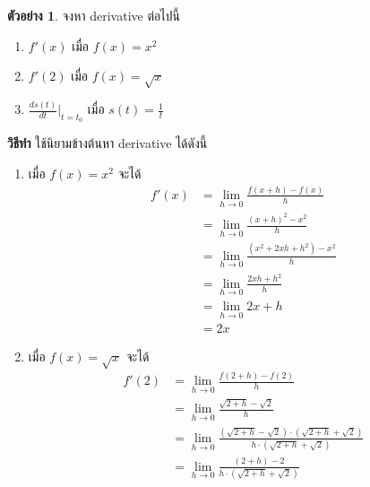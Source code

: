 \documentclass[
]{book}
\theoremstyle{definition}
\theoremstyle{definition}
\newtheorem{example}{ตัวอย่าง}[chapter]
\theoremstyle{definition}
\theoremstyle{definition}
\theoremstyle{remark}
\begin{document}
\begin{example}

จงหา derivative ต่อไปนี้

\begin{enumerate}
\def\labelenumi{(\arabic{enumi})}
\item
  \(f'(x)\) เมื่อ \(f(x) = x^2\)
\item
  \(f'(2)\) เมื่อ \(f(x) = \sqrt{x}\)
\item
  \(\frac{ds(t)}{dt}|_{t=t_0}\) เมื่อ \(s(t) = \frac{1}{t}\)
\end{enumerate}

\end{example}

\textbf{วิธีทำ} ใช้นิยามข้างต้นหา derivative ได้ดังนี้

\begin{enumerate}
\def\labelenumi{(\arabic{enumi})}
\item
  เมื่อ \(f(x) = x^2\) จะได้ \begin{equation}   \begin{aligned}
              f'(x) &= \underset{h \rightarrow 0}{\lim}\frac{f(x+h) - f(x)}{h} \\
                  &= \underset{h \rightarrow 0}{\lim}\frac{(x+h)^2-x^2}{h} \\
                  &= \underset{h \rightarrow 0}{\lim}\frac{(x^2+2xh+h^2)-x^2}{h} \\
                  &= \underset{h \rightarrow 0}{\lim}\frac{2xh+h^2}{h} \\
                  &= \underset{h \rightarrow 0}{\lim}2x + h \\
                  &= 2x
    \end{aligned} \end{equation}
\item
  เมื่อ \(f(x) = \sqrt{x}\) จะได้ \begin{equation}   \begin{aligned}
              f'(2) &= \underset{h \rightarrow 0}{\lim}\frac{f(2+h) - f(2)}{h} \\
                  &= \underset{h \rightarrow 0}{\lim}\frac{\sqrt{2+h} - \sqrt{2}}{h} \\
                  &= \underset{h \rightarrow 0}{\lim}\frac{(\sqrt{2+h} - \sqrt{2}) \cdot
                  (\sqrt{2+h} + \sqrt{2})}{h \cdot (\sqrt{2+h} + \sqrt{2})} \\
                  &= \underset{h \rightarrow 0}{\lim}\frac{(2+h)-2}{h\cdot (\sqrt{2+h} + \sqrt{2})} \\

\end{aligned}
\end{equation}
\end{enumerate}
\end{document}
